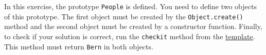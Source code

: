 \documentclass [11pt, a4wide, twoside]{article}
\begin{document}
In this exercise, the prototype \texttt{People} is defined. You need to define two objects of this prototype.
The first object must be created by the \texttt{Object.create()} method and the second object must be created by a constructor function.
Finally, to check if your solution is correct, run the \texttt{checkit} method from the \href{http://scg.unibe.ch/download/lectures/pl2018-exercises/Third-template.htm}{template}.
This method must return \texttt{Bern} in both objects.




\vspace{0.5cm}
\solution{}
\end{document}
